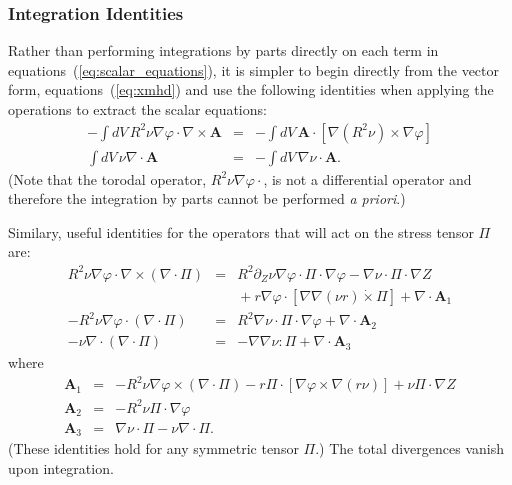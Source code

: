 \documentclass[letterpaper]{book}
\renewcommand{\vec}[1]{\ensuremath{\mathbf{#1}}}
\newcommand{\tensor}[1]{\mathsf{#1}}
\newcommand{\tor}{\varphi}              %
\renewcommand{\P}{\tensor{\Pi}}
\newcommand{\grad}[1]{\nabla #1}
\renewcommand{\div}[1]{\nabla \cdot #1}
\newcommand{\curl}[1]{\nabla \times #1}
\newcommand{\dotdot}{:}
\newcommand{\dottimes}{\dot\times}
\begin{document}
\subsubsection{Integration Identities}

Rather than performing integrations by parts directly on each term in
equations~(\ref{eq:scalar_equations}), it is simpler to begin directly
from the vector form, equations~(\ref{eq:xmhd}) and use the following
identities when applying the operations to extract the scalar
equations:
\begin{eqnarray*}
  -\int dV\, R^2 \nu \grad{\tor} \cdot \curl{\vec{A}} & = & 
  -\int dV\, \vec{A} \cdot \left[\grad{(R^2 \nu)} \times \grad{\tor}
    \right]
  \\
  \int dV\, \nu \div{\vec{A}} & = & 
  -\int dV\, \grad{\nu} \cdot \vec{A}.
\end{eqnarray*}
(Note that the torodal operator, $R^2 \nu \grad{\tor} \cdot$, is not a
differential operator and therefore the integration by parts cannot be
performed \emph{a priori}.)  

Similary, useful identities for the operators that will act on the
stress tensor $\P$ are:
\begin{subequations}
\label{eq:tensor_identities}
\begin{eqnarray}
  R^2 \nu \grad{\tor} \cdot \curl{(\div{\P})} & = & 
  R^2 \partial_Z \nu \grad{\tor} \cdot \P \cdot \grad{\tor}
  - \grad{\nu} \cdot \P \cdot \grad{Z}
  \\ && \mbox{}
  + r \grad{\tor} \cdot \left[\grad{\grad{(\nu r)}} \dottimes \P\right]
  + \div{ \vec{A}_1 }\nonumber
  \\
  -R^2 \nu \grad{\tor} \cdot (\div{\P}) & = &
  R^2 \grad{\nu} \cdot \P \cdot \grad{\tor}
  + \div{\vec{A}_2}
  \\
  -\nu \div{(\div{\P})} & = & -\grad{\grad{\nu}} \dotdot \P + \div{\vec{A}_3}
\end{eqnarray}
\end{subequations}
where
\begin{eqnarray*} 
  \vec{A}_1 & = & 
  - R^2 \nu \grad{\tor} \times (\div{\P})
  - r \P \cdot \left[ \grad{\tor} \times \grad{(r \nu)} \right]
  + \nu \P \cdot \grad{Z}
  \\
  \vec{A}_2 & = & -R^2 \nu \P \cdot \grad{\tor}
  \\
  \vec{A}_3 & = & \grad{\nu} \cdot \P - \nu \div{\P}.
\end{eqnarray*}
(These identities hold for any symmetric tensor $\P$.)  The total
divergences vanish upon integration.
\end{document}
